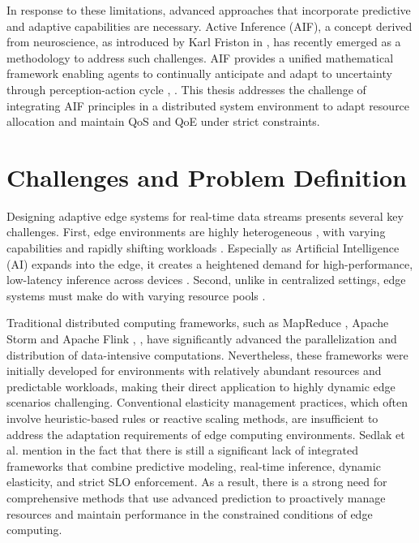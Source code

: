 In response to these limitations, advanced approaches that incorporate predictive and adaptive
capabilities are necessary. Active Inference (AIF), a concept derived from neuroscience, as introduced by Karl Friston in \cite{friston_free-energy_2010}, has recently emerged as a methodology to address such challenges. AIF provides a unified mathematical framework enabling agents to
continually anticipate and adapt to uncertainty through perception-action cycle \cite{friston_active_2016}, \cite{lanillos_active_2021}. This thesis addresses the challenge of integrating AIF principles in a distributed system environment to adapt resource allocation and maintain QoS and QoE under strict constraints.

\section{Challenges and Problem Definition}
Designing adaptive edge systems for real-time data streams presents several key
challenges. First, edge environments are highly heterogeneous \cite{furst_elastic_2018}, with varying capabilities and
rapidly shifting workloads \cite{danilenka_adaptive_2025}. Especially as Artificial Intelligence (AI) expands into the edge, it creates a heightened demand for high-performance, low-latency inference across devices \cite{oquinn_environment-aware_2025}. Second, unlike in centralized settings, edge systems must make do with varying resource pools \cite{sedlak_equilibrium_2024}.

Traditional distributed computing frameworks, such as MapReduce \cite{dean_mapreduce_2008},
Apache Storm\cite{noauthor_apache_nodate} and Apache Flink \cite{noauthor_apache_nodate-1}, \cite{carbone_apache_2015}, have significantly advanced the parallelization and
distribution of data-intensive computations. Nevertheless, these frameworks were initially
developed for environments with relatively abundant resources and predictable workloads,
making their direct application to highly dynamic edge scenarios challenging. Conventional elasticity management practices, which often involve heuristic-based rules or reactive scaling methods, are insufficient to address the adaptation requirements of edge computing environments. Sedlak et al. mention in \cite{sedlak_diffusing_2024} the fact that there is still a significant lack of integrated frameworks that combine predictive modeling, real-time inference, dynamic elasticity, and strict SLO enforcement. As a result, there is a strong need for comprehensive methods that use advanced prediction to proactively manage resources and maintain performance in the constrained conditions of edge computing.

